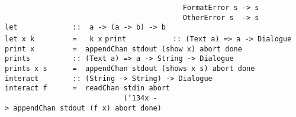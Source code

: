 \mbox{\tt \ \ \ \ \ \ \ \ \ \ \ \ \ \ \ \ \ \ \ \ \ \ \ \ \ \ \ \ \ \ \ \ \ \ \ \ \ \ \ \ \ \ FormatError\ s\ ->\ s}\\
\mbox{\tt \ \ \ \ \ \ \ \ \ \ \ \ \ \ \ \ \ \ \ \ \ \ \ \ \ \ \ \ \ \ \ \ \ \ \ \ \ \ \ \ \ \ OtherError\ s\ \ ->\ s}
%
\eprogB\noindent\bprogB
\mbox{\tt let\ \ \ \ \ \ \ \ \ \ \ \ \ ::\ \ a\ ->\ (a\ ->\ b)\ ->\ b}\\
\mbox{\tt let\ x\ k\ \ \ \ \ \ \ \ \ =\ \ \ k\ x}
%
\eprogB\noindent\bprogB
\mbox{\tt print\ \ \ \ \ \ \ \ \ \ \ ::\ (Text\ a)\ =>\ a\ ->\ Dialogue}\\
\mbox{\tt print\ x\ \ \ \ \ \ \ \ \ =\ \ appendChan\ stdout\ (show\ x)\ abort\ done}\\
\mbox{\tt prints\ \ \ \ \ \ \ \ \ \ ::\ (Text\ a)\ =>\ a\ ->\ String\ ->\ Dialogue}\\
\mbox{\tt prints\ x\ s\ \ \ \ \ \ =\ \ appendChan\ stdout\ (shows\ x\ s)\ abort\ done}
%
%
\eprogB\noindent\bprogB
\mbox{\tt interact\ \ \ \ \ \ \ \ ::\ (String\ ->\ String)\ ->\ Dialogue}\\
\mbox{\tt interact\ f\ \ \ \ \ \ =\ \ readChan\ stdin\ abort}\\
\mbox{\tt \ \ \ \ \ \ \ \ \ \ \ \ \ \ \ \ \ \ \ \ \ \ \ \ \ \ \ \ ({\char'134}x\ ->\ appendChan\ stdout\ (f\ x)\ abort\ done)}
%
\eprogB
